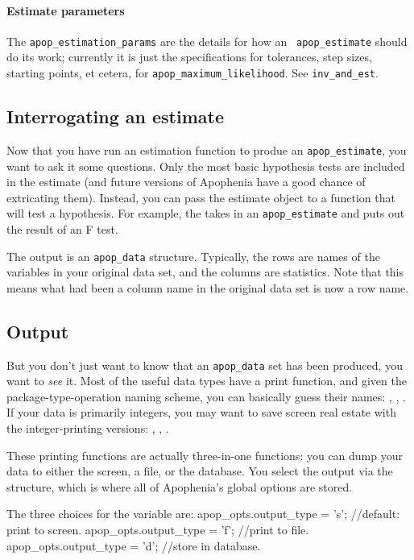 \paragraph{Estimate parameters}
The {\tt apop\_estimation\_params} are the details for how an {\tt
apop\_estimate} should do its work; currently it is just the specifications
for tolerances, step sizes, starting points, et cetera, for {\tt apop\_max\-i\-mum\_like\-li\-hood}.
 See {\tt inv\_and\_est}.

\subsection{Interrogating an estimate}
Now that you have run an estimation function to produe an 
{\tt apop\_\-estimate}, you want to ask it some questions. Only the most
basic hypothesis tests are included in the estimate (and future versions
of Apophenia have a good chance of extricating them). Instead, you can
pass the estimate object to a function that will test a hypothesis. For
example, the  takes in an 
{\tt apop\_\-estimate} and puts out the result of an F test.

The output is an {\tt apop\_\-data} structure. Typically, the rows are
names of the variables in your original data set, and the columns are
statistics. Note that this means what had been a column name in the 
original data set is now a row name.


\subsection{Output} 
But you don't just want to know that an {\tt apop\_\-data} set has been
produced, you want to {\sl see} it.  Most of the useful data types have
a print function, and given the package-type-operation naming scheme,
you can basically guess their names: ,
, . If your
data is primarily integers, you may want to save screen real estate
with the integer-printing versions: ,
, .

These printing functions are actually three-in-one functions: you can
dump your data to either the screen, a file, or the database. You select
the output via the  structure, which is where all of
Apophenia's global options are stored. 

The three choices for the  
variable are:
apop_opts.output_type   = 's';  //default: print to screen.
apop_opts.output_type   = 'f';  //print to file.
apop_opts.output_type   = 'd';  //store in database.

